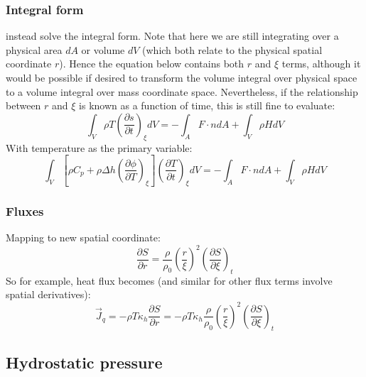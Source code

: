 \subsubsection{Integral form}
\cite{BSW18} instead solve the integral form.  Note that here we are still integrating over a physical area $dA$ or volume $dV$ (which both relate to the physical spatial coordinate $r$).  Hence the equation below contains both $r$ and $\xi$ terms, although it would be possible if desired to transform the volume integral over physical space to a volume integral over mass coordinate space.  Nevertheless, if the relationship between $r$ and $\xi$ is known as a function of time, this is still fine to evaluate:
\begin{equation}
\int_V \rho T \left( \frac{\partial s}{\partial t} \right)_\xi dV = - \int_A F \cdot n dA + \int_V \rho H dV
\end{equation}
With temperature as the primary variable:
\begin{equation}
\int_V \left[ \rho C_p + \rho \Delta h \left(\frac{\partial \phi}{\partial T} \right)_\xi \right] \left( \frac{\partial T}{\partial t} \right)_\xi dV = - \int_A F \cdot n dA + \int_V \rho H dV
\end{equation}
\subsubsection{Fluxes}
Mapping to new spatial coordinate:
\begin{equation}
\frac{\partial S}{\partial r}=\frac{\rho}{\rho_0} \left( \frac{r}{\xi} \right)^2 \left(\frac{\partial S}{\partial \xi} \right)_t
\end{equation}
So for example, heat flux becomes (and similar for other flux terms involve spatial derivatives):
\begin{equation}
\vec{J}_q=-\rho T \kappa_h \frac{\partial S}{\partial r} = -\rho T \kappa_h \frac{\rho}{\rho_0} \left( \frac{r}{\xi} \right)^2 \left(\frac{\partial S}{\partial \xi} \right)_t
\end{equation}
\subsection{Hydrostatic pressure}
\label{sect:hydrostatic}
\\
